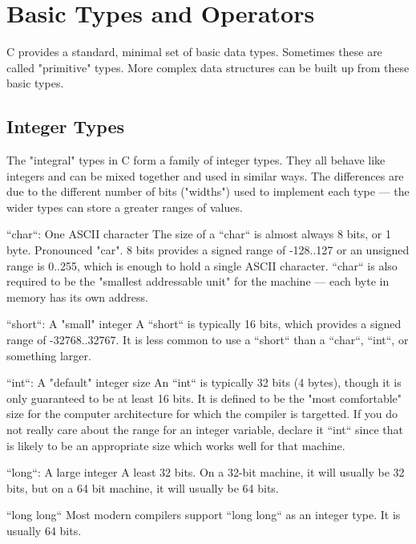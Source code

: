 \chapter{Basic Types and Operators}

C provides a standard, minimal set of basic data types.  Sometimes these are called "primitive" types.  More complex data structures can be built up from these basic types.

\section{Integer Types}

The "integral" types in C form a family of integer types. They all behave like integers and can be mixed together and used in similar ways. The differences are due to the different number of bits ("widths") used to implement each type --- the wider types can store a greater ranges of values.

``char``: One ASCII character
    The size of a ``char`` is almost always 8 bits, or 1 byte.  Pronounced "car".  8 bits provides a signed range of -128..127 or an unsigned range is 0..255, which is enough to hold a single ASCII character. ``char`` is also required to be the "smallest addressable unit" for the machine --- each byte in memory has its own address.

``short``: A "small" integer
    A ``short`` is typically 16 bits, which provides a signed range of -32768..32767.  It is less common to use a ``short`` than a ``char``, ``int``, or something larger.

``int``: A "default" integer size
    An ``int`` is typically 32 bits (4 bytes), though it is only guaranteed to be at least 16 bits.  It is defined to be the "most comfortable" size for the computer architecture for which the compiler is targetted.  If you do not really care about the range for an integer variable, declare it ``int`` since that is likely to be an appropriate size which works well for that machine.

``long``: A large integer
    A least 32 bits.  On a 32-bit machine, it will usually be 32 bits, but on a 64 bit machine, it will usually be 64 bits.  
    
``long long``
    Most modern compilers support ``long long`` as an integer type.  It is usually 64 bits.


